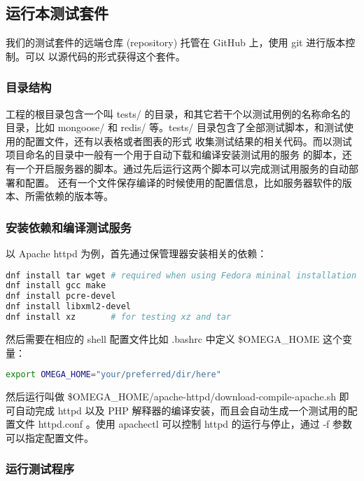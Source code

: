 \subsection{运行本测试套件}

我们的测试套件的远端仓库 (repository) 托管在 GitHub 上，使用 git 进行版本控制。可以
以源代码的形式获得这个套件。

\subsubsection{目录结构}

工程的根目录包含一个叫 tests/ 的目录，和其它若干个以测试用例的名称命名的目录，比如 mongoose/
和 redis/ 等。tests/ 目录包含了全部测试脚本，和测试使用的配置文件，还有以表格或者图表的形式
收集测试结果的相关代码。而以测试项目命名的目录中一般有一个用于自动下载和编译安装测试用的服务
的脚本，还有一个开启服务器的脚本。通过先后运行这两个脚本可以完成测试用服务的自动部署和配置。
还有一个文件保存编译的时候使用的配置信息，比如服务器软件的版本、所需依赖的版本等。

\subsubsection{安装依赖和编译测试服务}

以 Apache httpd 为例，首先通过保管理器安装相关的依赖：

\begin{lstlisting}[language=bash]
dnf install tar wget # required when using Fedora mininal installation
dnf install gcc make
dnf install pcre-devel
dnf install libxml2-devel
dnf install xz       # for testing xz and tar
\end{lstlisting}

然后需要在相应的 shell 配置文件比如 .bashrc 中定义 \$OMEGA\_HOME 这个变量：

\begin{lstlisting}[language=bash]
export OMEGA_HOME="your/preferred/dir/here"
\end{lstlisting}

然后运行叫做 \$OMEGA\_HOME/apache-httpd/download-compile-apache.sh 即可自动完成
httpd 以及 PHP 解释器的编译安装，而且会自动生成一个测试用的配置文件 httpd.conf 。使用
apachectl 可以控制 httpd 的运行与停止，通过 -f 参数可以指定配置文件。

\subsubsection{运行测试程序}

